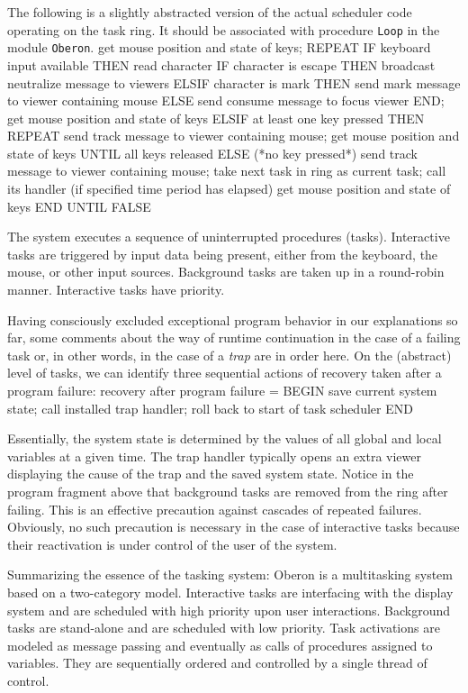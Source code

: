 The following is a slightly abstracted version of the actual scheduler
code operating on the task ring. It should be associated with
procedure {\tt Loop\/} in the module {\tt Oberon\/}.
\begintt
get mouse position and state of keys;
REPEAT
  IF keyboard input available THEN read character
    IF character is escape THEN
      broadcast neutralize message to viewers
    ELSIF character is mark THEN
      send mark message to viewer containing mouse
    ELSE send consume message to focus viewer
    END;
    get mouse position and state of keys
  ELSIF at least one key pressed THEN
    REPEAT
      send track message to viewer containing mouse;
      get mouse position and state of keys
    UNTIL all keys released
  ELSE (*no key pressed*)
    send track message to viewer containing mouse;
    take next task in ring as current task;
    call its handler (if specified time period has elapsed)
    get mouse position and state of keys
  END
UNTIL FALSE
\endtt

\noindent The system executes a sequence of uninterrupted procedures
(tasks). Interactive tasks are triggered by input data being present,
either from the keyboard, the mouse, or other input
sources. Background tasks are taken up in a round-robin
manner. Interactive tasks have priority.

Having consciously excluded exceptional program behavior in our
explanations so far, some comments about the way of runtime
continuation in the case of a failing task or, in other words, in the
case of a {\it trap\/} are in order here. On the (abstract) level of tasks, we
can identify three sequential actions of recovery taken after a
program failure:
\begintt
recovery after program failure =
BEGIN save current system state;
  call installed trap handler;
  roll back to start of task scheduler
END
\endtt

\noindent Essentially, the system state is determined by the values of all
global and local variables at a given time. The trap handler typically
opens an extra viewer displaying the cause of the trap and the saved
system state. Notice in the program fragment above that background
tasks are removed from the ring after failing. This is an effective
precaution against cascades of repeated failures. Obviously, no such
precaution is necessary in the case of interactive tasks because their
reactivation is under control of the user of the system.

Summarizing the essence of the tasking system: Oberon is a
multitasking system based on a two-category model. Interactive tasks
are interfacing with the display system and are scheduled with high
priority upon user interactions. Background tasks are stand-alone and
are scheduled with low priority. Task activations are modeled as
message passing and eventually as calls of procedures assigned to
variables. They are sequentially ordered and controlled by a single
thread of control.

